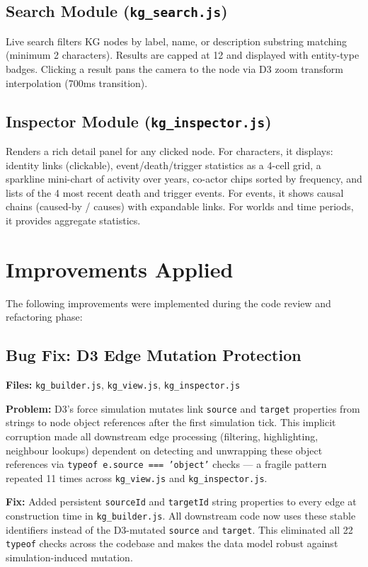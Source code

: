 \documentclass[11pt,a4paper]{article}
\begin{document}
\subsection{Search Module (\texttt{kg\_search.js})}
Live search filters KG nodes by label, name, or description substring matching (minimum 2 characters). Results are capped at 12 and displayed with entity-type badges. Clicking a result pans the camera to the node via D3 zoom transform interpolation (700ms transition).

\subsection{Inspector Module (\texttt{kg\_inspector.js})}
Renders a rich detail panel for any clicked node. For characters, it displays: identity links (clickable), event/death/trigger statistics as a 4-cell grid, a sparkline mini-chart of activity over years, co-actor chips sorted by frequency, and lists of the 4 most recent death and trigger events. For events, it shows causal chains (caused-by / causes) with expandable links. For worlds and time periods, it provides aggregate statistics.

\section{Improvements Applied}
\label{sec:improvements}

The following improvements were implemented during the code review and refactoring phase:

\subsection{Bug Fix: D3 Edge Mutation Protection}
\label{sec:mutationfix}
\textbf{Files:} \texttt{kg\_builder.js}, \texttt{kg\_view.js}, \texttt{kg\_inspector.js}

\textbf{Problem:} D3's force simulation mutates link \texttt{source} and \texttt{target} properties from strings to node object references after the first simulation tick. This implicit corruption made all downstream edge processing (filtering, highlighting, neighbour lookups) dependent on detecting and unwrapping these object references via \texttt{typeof e.source === 'object'} checks --- a fragile pattern repeated 11 times across \texttt{kg\_view.js} and \texttt{kg\_inspector.js}.

\textbf{Fix:} Added persistent \texttt{sourceId} and \texttt{targetId} string properties to every edge at construction time in \texttt{kg\_builder.js}. All downstream code now uses these stable identifiers instead of the D3-mutated \texttt{source} and \texttt{target}. This eliminated all 22 \texttt{typeof} checks across the codebase and makes the data model robust against simulation-induced mutation.
\end{document}
